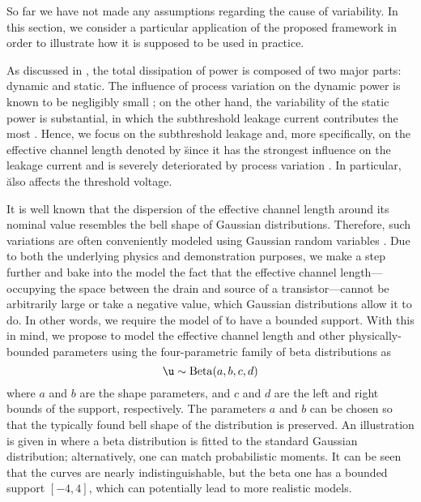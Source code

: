 So far we have not made any assumptions regarding the cause of variability. In
this section, we consider a particular application of the proposed framework in
order to illustrate how it is supposed to be used in practice.

As discussed in , the total dissipation of power is composed
of two major parts: dynamic and static. The influence of process variation on
the dynamic power is known to be negligibly small \cite{srivastava2010}; on the
other hand, the variability of the static power is substantial, in which the
subthreshold leakage current contributes the most \cite{juan2011, juan2012}.
Hence, we focus on the subthreshold leakage and, more specifically, on the
effective channel length denoted by \u since it has the strongest influence on
the leakage current and is severely deteriorated by process variation
\cite{chandrakasan2000}. In particular, \u also affects the threshold voltage.

It is well known that the dispersion of the effective channel length around its
nominal value resembles the bell shape of Gaussian distributions. Therefore,
such variations are often conveniently modeled using Gaussian random variables
\cite{bhardwaj2006, ghanta2006, huang2009a, shen2009, chandra2010,
srivastava2010, juan2011, juan2012, lee2013}. Due to both the underlying physics
and demonstration purposes, we make a step further and bake into the model the
fact that the effective channel length---occupying the space between the drain
and source of a transistor---cannot be arbitrarily large or take a negative
value, which Gaussian distributions allow it to do. In other words, we require
the model of \u to have a bounded support. With this in mind, we propose to
model the effective channel length and other physically-bounded parameters using
the four-parametric family of beta distributions as
\[
  \u \sim \mathrm{Beta}(a, b, c, d)
\]
where $a$ and $b$ are the shape parameters, and $c$ and $d$ are the left and
right bounds of the support, respectively. The parameters $a$ and $b$ can be
chosen so that the typically found bell shape of the distribution is preserved.
An illustration is given in  where a beta distribution is
fitted to the standard Gaussian distribution; alternatively, one can match
probabilistic moments. It can be seen that the curves are nearly
indistinguishable, but the beta one has a bounded support $[-4, 4]$, which can
potentially lead to more realistic models.

